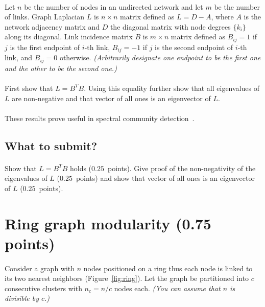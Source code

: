 \documentclass[11pt,a4paper]{article}
\newcommand{\hint}[1]{{\it (#1)}}
\newcommand{\points}[1]{({\color{magenta}$#1$~points})}
\newcommand{\totals}[1]{({\color{magenta}#1 points})}
\newcommand{\figref}[1]{{\color{LimeGreen}Figure~\ref{fig:#1}}}
\begin{document}
\paragraph{} Let $n$ be the number of nodes in an undirected network and let $m$ be the number of links. Graph Laplacian $L$ is $n\times n$ matrix defined as $L=D-A$, where $A$ is the network adjacency matrix and $D$ the diagonal matrix with node degrees $\{k_i\}$ along its diagonal. Link incidence matrix $B$ is $m\times n$ matrix defined as $B_{ij}=1$ if $j$ is the first endpoint of $i$-th link, $B_{ij}=-1$ if $j$ is the second endpoint of $i$-th link, and $B_{ij}=0$ otherwise. \hint{Arbitrarily designate one endpoint to be the first one and the other to be the second one.} 

\paragraph{} First show that $L=B^TB$. Using this equality further show that all eigenvalues of $L$ are non-negative and that vector of all ones is an eigenvector of $L$. 

\paragraph{} These results prove useful in spectral community detection~\cite{Fie73,New10}.

\subsection*{What to submit?}

\paragraph{} Show that $L=B^TB$ holds \points{0.25}. Give proof of the non-negativity of the eigenvalues of $L$ \points{0.25} and show that vector of all ones is an eigenvector of $L$ \points{0.25}.

\section{Ring graph modularity \totals{0.75}}

\paragraph{} Consider a graph with $n$ nodes positioned on a ring thus each node is linked to its two nearest neighbors (\figref{ring}). Let the graph be partitioned into $c$ consecutive clusters with $n_c=n/c$ nodes each. \hint{You can assume that $n$ is divisible by $c$.} 
\end{document}
